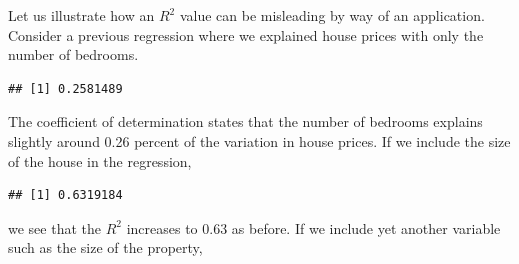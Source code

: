\documentclass[
]{book}
\newenvironment{Shaded}{\begin{snugshade}}{\end{snugshade}}
\newcommand{\AttributeTok}[1]{\textcolor[rgb]{0.77,0.63,0.00}{#1}}
\newcommand{\FunctionTok}[1]{\textcolor[rgb]{0.00,0.00,0.00}{#1}}
\newcommand{\NormalTok}[1]{#1}
\newcommand{\OtherTok}[1]{\textcolor[rgb]{0.56,0.35,0.01}{#1}}
\newcommand{\SpecialCharTok}[1]{\textcolor[rgb]{0.00,0.00,0.00}{#1}}
\begin{document}
Let us illustrate how an \(R^2\) value can be misleading by way of an application. Consider a previous regression where we explained house prices with only the number of bedrooms.

\begin{Shaded}
\end{Shaded}

\begin{verbatim}
## [1] 0.2581489
\end{verbatim}

The coefficient of determination states that the number of bedrooms explains slightly around 0.26 percent of the variation in house prices. If we include the size of the house in the regression,

\begin{Shaded}
\end{Shaded}

\begin{verbatim}
## [1] 0.6319184
\end{verbatim}

we see that the \(R^2\) increases to 0.63 as before. If we include yet another variable such as the size of the property,

\begin{Shaded}
\end{Shaded}
\end{document}
